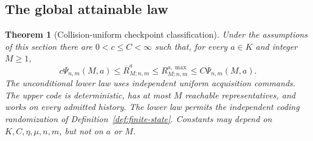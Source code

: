 \documentclass[11pt]{amsart}
\newtheorem{theorem}{Theorem}[section]
\theoremstyle{definition}\newtheorem{definition}[theorem]{Definition}
\theoremstyle{remark}\newtheorem{remark}[theorem]{Remark}
\begin{document}
\subsection{The global attainable law}
\begin{theorem}[Collision-uniform checkpoint classification]\label{thm:intrinsic-checkpoint}
Under the assumptions of this section there are $0<c\le C<\infty$
such that, for every $a\in K$ and integer $M\ge1$,
\begin{equation}\label{eq:intrinsic-checkpoint}
 c\Psi_{n,m}(M,a)\le\overline R_{M;n,m}^{a}
 \le R_{M;n,m}^{a,\max}\le C\Psi_{n,m}(M,a).
\end{equation}
The unconditional lower law uses independent uniform acquisition commands.
The upper code is deterministic, has at most $M$ reachable representatives,
and works on every admitted history. The lower law permits the independent
coding randomization of Definition~\ref{def:finite-state}. Constants may
depend on $K,C,\eta,\mu,n,m$, but not on $a$ or $M$.
\end{theorem}
\end{document}
